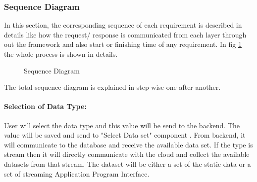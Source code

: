 \subsubsection{Sequence Diagram}
In this section, the corresponding sequence of each requirement is described in details like how the request/ response is communicated from each layer through out the framework and also start or finishing time of any requirement. In fig \ref{fig:labelOfSequenceDiagram} the whole process is shown in details.
\begin{figure}[htbp]
	\centering
	
	
	\caption{Sequence Diagram}
	\label{fig:labelOfSequenceDiagram}
\end{figure}
The total sequence diagram is explained in step wise one after another.
\paragraph{Selection of Data Type: }
User will select the data type and this value will be send to the backend. The value will be saved and send to "Select Data set" component . From backend, it will communicate to the database and receive the available data set. If the type is stream then it will directly communicate with the cloud and collect the available datasets from that stream. The dataset will be either a set of the static data or a set of streaming Application Program Interface.
